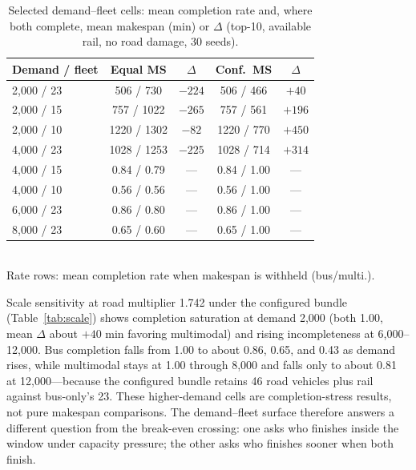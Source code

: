 \documentclass{ieeeaccess}
\begin{document}
\begin{table}[!t]
\caption{Selected demand--fleet cells: mean completion rate and, where both complete, mean makespan (min) or $\Delta$ (top-10, available rail, no road damage, 30 seeds).}
\label{tab:df}
\centering
\footnotesize
\begin{tabular}{@{}lcc@{\quad}cc@{}}
\hline
Demand / fleet & Equal MS & $\Delta$ & Conf.\ MS & $\Delta$ \\
\hline
2{,}000 / 23 & 506 / 730 & $-224$ & 506 / 466 & $+40$ \\
2{,}000 / 15 & 757 / 1022 & $-265$ & 757 / 561 & $+196$ \\
2{,}000 / 10 & 1220 / 1302 & $-82$ & 1220 / 770 & $+450$ \\
4{,}000 / 23 & 1028 / 1253 & $-225$ & 1028 / 714 & $+314$ \\
4{,}000 / 15 & 0.84 / 0.79 & --- & 0.84 / 1.00 & --- \\
4{,}000 / 10 & 0.56 / 0.56 & --- & 0.56 / 1.00 & --- \\
6{,}000 / 23 & 0.86 / 0.80 & --- & 0.86 / 1.00 & --- \\
8{,}000 / 23 & 0.65 / 0.60 & --- & 0.65 / 1.00 & --- \\
\hline
\end{tabular}
\\
\footnotesize{Rate rows: mean completion rate when makespan is withheld (bus/multi.).}
\end{table}

Scale sensitivity at road multiplier 1.742 under the configured bundle (Table~\ref{tab:scale}) shows completion saturation at demand 2{,}000 (both 1.00, mean $\Delta$ about $+40$ min favoring multimodal) and rising incompleteness at 6{,}000--12{,}000. Bus completion falls from 1.00 to about 0.86, 0.65, and 0.43 as demand rises, while multimodal stays at 1.00 through 8{,}000 and falls only to about 0.81 at 12{,}000---because the configured bundle retains 46 road vehicles plus rail against bus-only's 23. These higher-demand cells are completion-stress results, not pure makespan comparisons. The demand--fleet surface therefore answers a different question from the break-even crossing: one asks who finishes inside the window under capacity pressure; the other asks who finishes sooner when both finish.
\end{document}
